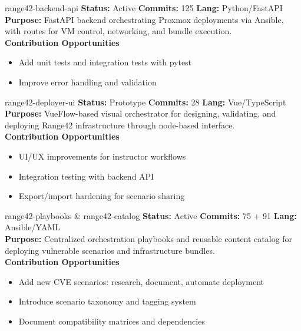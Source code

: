 \documentclass[aspectratio=169]{beamer}
\begin{document}
\begin{frame}[squeeze]{range42-backend-api \; \faProjectDiagram}
  \textbf{Status:} Active \hfill \textbf{Commits:} 125 \hfill \textbf{Lang:} Python/FastAPI\\[2mm]
  \textbf{Purpose:} FastAPI backend orchestrating Proxmox deployments via Ansible, with routes for VM control, networking, and bundle execution.\\[2mm]
  \textbf{Contribution Opportunities}
  \begin{itemize}
    \item Add unit tests and integration tests with pytest
    \item Improve error handling and validation
  \end{itemize}
\end{frame}

\begin{frame}[squeeze]{range42-deployer-ui \; \faDrawPolygon}
  \textbf{Status:} Prototype \hfill \textbf{Commits:} 28 \hfill \textbf{Lang:} Vue/TypeScript\\[2mm]
  \textbf{Purpose:} VueFlow-based visual orchestrator for designing, validating, and deploying Range42 infrastructure through node-based interface.\\[2mm]
  \textbf{Contribution Opportunities}
  \begin{itemize}
    \item UI/UX improvements for instructor workflows
    \item Integration testing with backend API
    \item Export/import hardening for scenario sharing
  \end{itemize}
\end{frame}

\begin{frame}[squeeze]{range42-playbooks \& range42-catalog \; \faCubes}
  \textbf{Status:} Active \hfill \textbf{Commits:} 75 + 91 \hfill \textbf{Lang:} Ansible/YAML\\[2mm]
  \textbf{Purpose:} Centralized orchestration playbooks and reusable content catalog for deploying vulnerable scenarios and infrastructure bundles.\\[2mm]
  \textbf{Contribution Opportunities}
  \begin{itemize}
    \item \alert{Add new CVE scenarios}: research, document, automate deployment
    \item Introduce scenario taxonomy and tagging system
    \item Document compatibility matrices and dependencies
  \end{itemize}
\end{frame}
\end{document}
